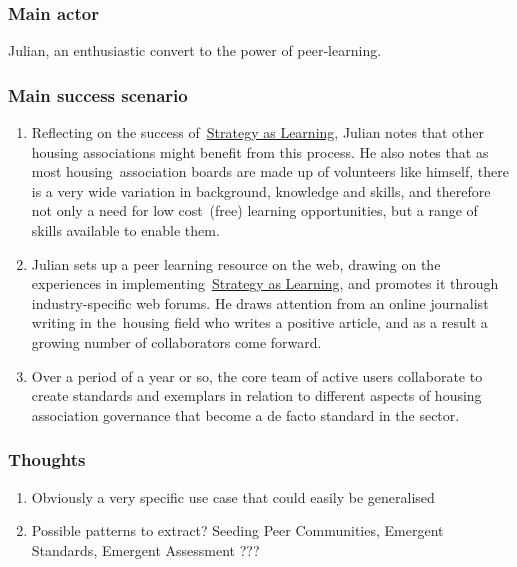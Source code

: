 \subsubsection{Main actor}

Julian, an enthusiastic convert to the power of peer-learning.

\subsubsection{Main success scenario}

\begin{enumerate}
\item
  Reflecting on the success
  of~\href{http://socialmediaclassroom.com/host/peeragogy/forum/patterns-and-use-cases\#comment-1749}{Strategy
  as Learning}, Julian notes that other housing associations might
  benefit from this process. He also notes that as most
  housing~association boards are made up of volunteers like himself,
  there is a very wide variation in background, knowledge and skills,
  and therefore not only a need for low cost~(free) learning
  opportunities, but a range of skills available to enable them.
\item
  Julian sets up a peer learning resource on the web, drawing on the
  experiences in
  implementing~\href{http://socialmediaclassroom.com/host/peeragogy/forum/patterns-and-use-cases\#comment-1749}{Strategy
  as Learning}, and promotes it through industry-specific web forums. He
  draws attention from an online journalist writing in the~housing field
  who writes a positive article, and as a result a growing number of
  collaborators come forward.
\item
  Over a period of a year or so, the core team of active users
  collaborate to create standards and exemplars in relation to different
  aspects of housing association governance that become a de facto
  standard in the sector.
\end{enumerate}

\subsubsection{Thoughts}

\begin{enumerate}
\item
  Obviously a very specific use case that could easily be generalised
\item
  Possible patterns to extract? Seeding Peer Communities, Emergent
  Standards, Emergent Assessment ???
\end{enumerate}
